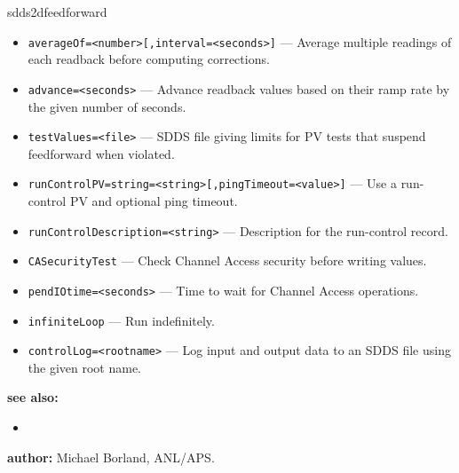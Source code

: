 \begin{sddsprog}{sdds2dfeedforward}
\begin{itemize}
  \item {\tt averageOf=<number>[,interval=<seconds>]} --- Average multiple
               readings of each readback before computing corrections.
  \item {\tt advance=<seconds>} --- Advance readback values based on their
               ramp rate by the given number of seconds.
  \item {\tt testValues=<file>} --- SDDS file giving limits for PV tests that
               suspend feedforward when violated.
  \item {\tt runControlPV=string=<string>[,pingTimeout=<value>]} --- Use a
               run-control PV and optional ping timeout.
  \item {\tt runControlDescription=<string>} --- Description for the
               run-control record.
  \item {\tt CASecurityTest} --- Check Channel Access security before
               writing values.
  \item {\tt pendIOtime=<seconds>} --- Time to wait for Channel Access
               operations.
  \item {\tt infiniteLoop} --- Run indefinitely.
  \item {\tt controlLog=<rootname>} --- Log input and output data to an
               SDDS file using the given root name.
\end{itemize}
\item \textbf{see also:}
\begin{itemize}
  \item {}
\end{itemize}
\item \textbf{author:} Michael Borland, ANL/APS.
\end{sddsprog}
